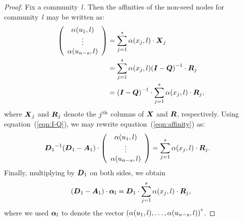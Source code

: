 \begin{proof}
Fix a community~$l$. Then the affinities of the non-seed nodes 
for community~$l$ may be written as:
\begin{align} \label{eqn:affinity}
	\left ( \begin{array}{c}
		\alpha (u_1, l) \\
		\vdots			\\
		\alpha (u_{n - s}, l)
	\end{array}	\right ) & = \sum_{j = 1}^{s} \alpha (x_j, l) \cdot \boldsymbol{X}_j \nonumber \\ 
						 & = \sum_{j = 1}^{s} \alpha (x_j, l) {(\boldsymbol{I} - \boldsymbol{Q})}^{-1} \cdot \boldsymbol{R}_j \nonumber \\ 
						 & = {(\boldsymbol{I} - \boldsymbol{Q})}^{-1} \cdot \sum_{j = 1}^{s} \alpha (x_j, l) \cdot \boldsymbol{R}_j,
\end{align}
where $\boldsymbol{X}_j$ and $\boldsymbol{R}_j$ denote the $j^{\textrm{th}}$ columns of $\boldsymbol{X}$ and $\boldsymbol{R}$, respectively. 
Using equation~(\ref{eqn:I-Q}), we may rewrite equation~(\ref{eqn:affinity}) as:
\begin{align}
	{\ensuremath{\boldsymbol{D}}_1}^{-1} (\boldsymbol{D}_1 - \boldsymbol{A}_1) \cdot \left ( \begin{array}{c}
		\alpha (u_1, l) \\
		\vdots			\\
		\alpha (u_{n - s}, l)
	\end{array}	\right ) & = \sum_{j = 1}^{s} \alpha (x_j, l) \cdot \boldsymbol{R}_j.
\end{align}
Finally, multiplying by $\boldsymbol{D}_1$ on both sides, we obtain
\begin{equation}\label{eqn:final_affinity}
	(\boldsymbol{D}_1 - \boldsymbol{A}_1) \cdot \boldsymbol{\alpha}_l = \boldsymbol{D}_1 \cdot \sum_{j = 1}^{s} \alpha (x_j, l) \cdot \boldsymbol{R}_j,
\end{equation}
where we used $\boldsymbol{\alpha}_l$ to denote the vector ${\left ( \alpha (u_1, l), \ldots, \alpha (u_{n-s}, l) \right )}^{\scriptscriptstyle \mathsf{T}}$.


\end{proof}
